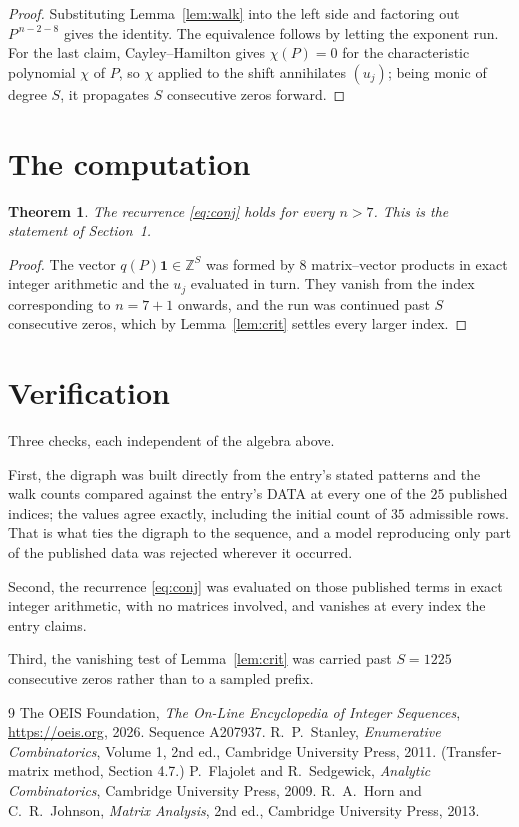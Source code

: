 \documentclass[11pt,a4paper]{article}
\theoremstyle{plain}
\newtheorem{theorem}{Theorem}
\theoremstyle{definition}
\begin{document}
\begin{proof}
Substituting Lemma~\ref{lem:walk} into the left side and factoring out
$P^{\,n-2-8}$ gives the identity. The equivalence follows by letting the exponent
run. For the last claim, Cayley--Hamilton gives $\chi(P)=0$ for the characteristic
polynomial $\chi$ of $P$, so $\chi$ applied to the shift annihilates $(u_j)$; being monic of
degree $S$, it propagates $S$ consecutive zeros forward.
\end{proof}

\section{The computation}

\begin{theorem}
The recurrence \eqref{eq:conj} holds for every $n>7$. This is the statement of
Section~1.
\end{theorem}

\begin{proof}
The vector $q(P)\mathbf{1}\in\mathbb{Z}^{S}$ was formed by $8$ matrix--vector
products in exact integer arithmetic and the $u_j$ evaluated in turn. They vanish from the
index corresponding to $n=7+1$ onwards, and the run was continued past $S$ consecutive
zeros, which by Lemma~\ref{lem:crit} settles every larger index.
\end{proof}

\section{Verification}

Three checks, each independent of the algebra above.

First, the digraph was built directly from the entry's stated patterns and the walk counts
compared against the entry's DATA at every one of the $25$ published indices; the
values agree exactly, including the initial count of $35$ admissible rows. That is
what ties the digraph to the sequence, and a model reproducing only part of the published
data was rejected wherever it occurred.

Second, the recurrence \eqref{eq:conj} was evaluated on those published terms in exact
integer arithmetic, with no matrices involved, and vanishes at every index the entry claims.

Third, the vanishing test of Lemma~\ref{lem:crit} was carried past $S=1225$ consecutive
zeros rather than to a sampled prefix.

\begin{thebibliography}{9}
 The OEIS Foundation, \emph{The On-Line Encyclopedia of Integer
Sequences}, \url{https://oeis.org}, 2026. Sequence A207937.
 R.~P.~Stanley, \emph{Enumerative Combinatorics}, Volume 1, 2nd ed.,
Cambridge University Press, 2011. (Transfer-matrix method, Section 4.7.)
 P.~Flajolet and R.~Sedgewick, \emph{Analytic Combinatorics}, Cambridge
University Press, 2009.
 R.~A.~Horn and C.~R.~Johnson, \emph{Matrix Analysis}, 2nd ed., Cambridge
University Press, 2013.
\end{thebibliography}
\end{document}
